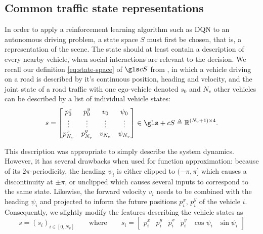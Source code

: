 \subsection{Common traffic state representations}

In order to apply a reinforcement learning algorithm such as \gls{DQN} to an autonomous driving problem, a state space $S$ must first be chosen, that is, a representation of the scene. The state should at least contain a description of every nearby vehicle, when social interactions are relevant to the decision. We recall our definition \eqref{eq:state-space} of $\cS$ from , in which a vehicle driving on a road is described by it's continuous position, heading and velocity, and the joint state of a road traffic with one ego-vehicle denoted $s_0$ and $N_v$ other vehicles can be described by a list of individual vehicle states:
\begin{equation*}
s = \begin{bmatrix}
p^x_0 & p^y_0 & v_0 & \psi_0\\
\vdots & \vdots & \vdots & \vdots\\
p^x_{N_v} & p^y_{N_v} & v_{N_v} & \psi_{N_v}\\
\end{bmatrix}
\in\gls+{cS} \eqdef\Real^{(N_v+1) \times 4}.
\end{equation*}

This description was appropriate to simply describe the system dynamics. However, it has several drawbacks when used for function approximation: because of its $2\pi$-periodicity, the heading $\psi_i$ is either clipped to $(-\pi, \pi]$ which causes a discontinuity at $\pm\pi$, or unclipped which causes several inputs to correspond to the same state. Likewise, the forward velocity $v_i$ needs to be combined with the heading $\psi_i$ and projected to inform the future positions $p^x_i,\,p^y_i$ of the vehicle $i$. Consequently, we slightly modify the features describing the vehicle states as
\begin{equation}
s = \left(s_i \right)_{i \in [0, N_v]}\qquad
\text{where}\qquad
s_i = \begin{bmatrix}
p^x_i & p^y_i & \dot{p}^x_i & \dot{p}^y_i & \cos\psi_i & \sin \psi_i
\end{bmatrix}
\label{eq:coordinates}
\end{equation}


